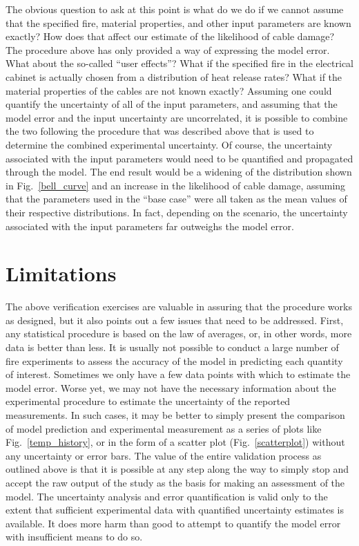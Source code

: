The obvious question to ask at this point is what do we do if we cannot assume that the specified fire, material properties, and other input parameters are
known exactly? How does that affect our estimate of the likelihood of cable damage? The procedure above has only provided a way of expressing the model
error. What about the so-called ``user effects''? What if the specified fire in the electrical cabinet is actually chosen from a distribution of heat release rates?
What if the material properties of the cables are not known exactly? Assuming one could quantify the uncertainty of all of the input parameters, and assuming that the model error
and the input uncertainty are uncorrelated, it is possible to combine the two following the procedure that was described above that is used to determine the combined
experimental uncertainty. Of
course, the uncertainty associated with the input parameters would need to be quantified and propagated through the model. The end result would be a widening of
the distribution shown in Fig.~\ref{bell_curve} and an increase in the likelihood of cable damage, assuming that the parameters used in the ``base case'' were
all taken as the mean values of their respective distributions. In fact, depending on the scenario, the uncertainty associated with the input parameters far outweighs
the model error.


\section{Limitations}

The above verification exercises are valuable in assuring that the procedure works as designed, but it also points out a few issues that need to be addressed. First, any
statistical procedure is based on the law of averages, or, in other words, more data is better than less. It is usually not possible to conduct a large number of
fire experiments
to assess the accuracy of the model in predicting each quantity of interest. Sometimes we only have a few data points with which to estimate the model error. Worse yet,
we may not have the necessary information about the experimental procedure to estimate the uncertainty of the reported measurements. In such cases, it may be better
to simply present the comparison of model prediction and experimental measurement as a series of plots like Fig.~\ref{temp_history}, or in the form of a scatter plot
(Fig.~\ref{scatterplot}) without any uncertainty or error bars. The value of the entire validation process as outlined above is that it is possible at any step
along the way to simply stop and accept the raw output of the study as the basis for making an assessment of the model. The uncertainty analysis and error
quantification is valid only to
the extent that sufficient experimental data with quantified uncertainty estimates is available. It does more harm than good to attempt to quantify the model error
with insufficient means to do so.

